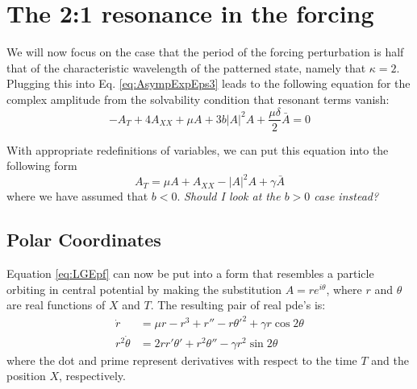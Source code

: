 \documentclass[api,pof,pre,12pt,a4paper]{revtex4-1}
\begin{document}
\section{The 2:1 resonance in the forcing}
We will now focus on the case that the period of the forcing perturbation is half that of the characteristic wavelength of the patterned state, namely that $\kappa=2$.  Plugging this into Eq. \ref{eq:AsympExpEps3} leads to the following equation for the complex amplitude from the solvability condition that resonant terms vanish:
\begin{equation}
-A_T  +4 A_{XX}+\mu A + 3b |A|^2 A+\frac{\mu\delta}{2}\bar{A}=0
\label{eq:LGEpf1}
\end{equation}

With appropriate redefinitions of variables, we can put this equation into the following form
\begin{equation}
A_T  = \mu A + A_{XX} - |A|^2 A+\gamma\bar{A}
\label{eq:LGEpf}
\end{equation}
where we have assumed that $b<0$. {\it Should I look at the $b>0$ case instead?}

\subsection{Polar Coordinates}
Equation \ref{eq:LGEpf}  can now be put into a form that resembles a particle orbiting in central potential by making the substitution $A=r e^{i\theta}$, where $r$ and $\theta$ are real functions of $X$ and $T$.  The resulting pair of real pde's is:
\begin{subequations}
\begin{align}
\dot{r}&=\mu r - r^3 +r''-r\theta'^2+\gamma r \cos2\theta 
\label{eq:PolarGLEpfr} \\
r^2\dot{\theta}&=2 r r' \theta'+r^2\theta''-\gamma r^2 \sin 2\theta
\label{eq:PolarGLEpfth}
\end{align}
\end{subequations}
where the dot and prime represent derivatives with respect to the time $T$ and the position $X$, respectively.
\end{document}
